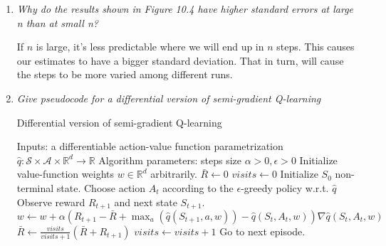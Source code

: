 \documentclass[12pt,a4paper]{article}
\begin{document}
\begin{enumerate}
  \item \textit{Why do the results shown in Figure 10.4 have higher standard errors at
  large n than at small n?}

  If $n$ is large, it's less predictable where we will end up in $n$ steps. This causes
  our estimates to have a bigger standard deviation. That in turn, will cause the steps
  to be more varied among different runs.
  
  \item \textit{Give pseudocode for a differential version of semi-gradient Q-learning}
   \begin{algorithm}
    \caption{Differential version of semi-gradient Q-learning}
    \begin{algorithmic}
        \STATE Inputs: a differentiable action-value function parametrization
        $\hat{q}: \mathcal{S} \times \mathcal{A} \times \mathbb{R}^d \rightarrow \mathbb{R}$
        \STATE Algorithm parameters: steps size $\alpha > 0, \epsilon > 0$
        \STATE Initialize value-function weights $w \in \mathbb{R}^d$ arbitrarily.
        \STATE $\bar{R} \leftarrow 0$
        \STATE $visits \leftarrow 0$
          \STATE Initialize $S_0$ non-terminal state.
            \STATE Choose action $A_t$ according to the $\epsilon$-greedy policy w.r.t. $\hat{q}$
            \STATE Observe reward $R_{t + 1}$ and next state $S_{t + 1}$.
            \STATE $w \leftarrow w + \alpha(R_{t + 1} - \bar{R} + \max_a(\hat{q}(S_{t + 1}, a, w))
            - \hat{q}(S_t, A_t, w)) \nabla \hat{q}(S_t, A_t, w)$
            \STATE $\bar{R} \leftarrow \frac{visits}{visits + 1} (\bar{R} + R_{t + 1})$
            \STATE $visits \leftarrow visits + 1$
              \STATE Go to next episode.
            \ENDIF
            \ENDFOR
        \ENDFOR
     \end{algorithmic}
   \end{algorithm}

\end{enumerate}
\end{document}
